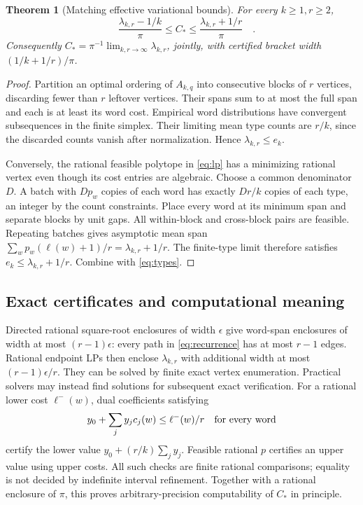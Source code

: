 \documentclass[11pt]{article}
\newtheorem{theorem}{Theorem}
\theoremstyle{definition}\newtheorem{definition}[theorem]{Definition}
\theoremstyle{remark}\newtheorem{remark}[theorem]{Remark}
\newcommand{\CC}{C_\ast}
\begin{document}
\begin{theorem}[Matching effective variational bounds]\label{thm:lp}
For every $k\ge1,r\ge2$,
\begin{equation}\label{eq:effective}
 \boxed{\quad\frac{\lambda_{k,r}-1/k}{\pi}\le\CC
 \le\frac{\lambda_{k,r}+1/r}{\pi}\quad}.
\end{equation}
Consequently $\CC=\pi^{-1}\lim_{k,r\to\infty}\lambda_{k,r}$, jointly,
with certified bracket width $(1/k+1/r)/\pi$.
\end{theorem}
\begin{proof}
Partition an optimal ordering of $A_{k,q}$ into consecutive blocks of
$r$ vertices, discarding fewer than $r$ leftover vertices. Their spans
sum to at most the full span and each is at least its word cost.
Empirical word distributions have convergent subsequences in the finite
simplex. Their limiting mean type counts are $r/k$, since the discarded
counts vanish after normalization. Hence $\lambda_{k,r}\le e_k$.

Conversely, the rational feasible polytope in \eqref{eq:lp} has a minimizing
rational vertex even though its cost entries are algebraic. Choose a
common denominator $D$. A batch with $Dp_w$ copies of each word has
exactly $Dr/k$ copies of each type, an integer by the count constraints.
Place every word at its minimum span and separate blocks by unit gaps.
All within-block and cross-block pairs are feasible. Repeating batches
gives asymptotic mean span
$\sum_w p_w(\ell(w)+1)/r=\lambda_{k,r}+1/r$.
The finite-type limit therefore satisfies
$e_k\le\lambda_{k,r}+1/r$. Combine with \eqref{eq:types}.
\end{proof}

\subsection{Exact certificates and computational meaning}
Directed rational square-root enclosures of width $\epsilon$ give
word-span enclosures of width at most $(r-1)\epsilon$: every path in
\eqref{eq:recurrence} has at most $r-1$ edges. Rational endpoint LPs
then enclose $\lambda_{k,r}$ with additional width at most
$(r-1)\epsilon/r$. They can be solved by finite exact vertex enumeration.
Practical solvers may instead find solutions for subsequent exact verification.
For a rational lower cost $\ell^-(w)$, dual coefficients satisfying
\[
 y_0+\sum_j y_jc_j(w)\le\ell^-(w)/r\quad\hbox{for every word}
\]
certify the lower value $y_0+(r/k)\sum_jy_j$. Feasible rational $p$
certifies an upper value using upper costs. All such checks are finite
rational comparisons; equality is not decided by indefinite interval
refinement. Together with a rational enclosure of $\pi$, this proves
arbitrary-precision computability of $\CC$ in principle.
\end{document}
